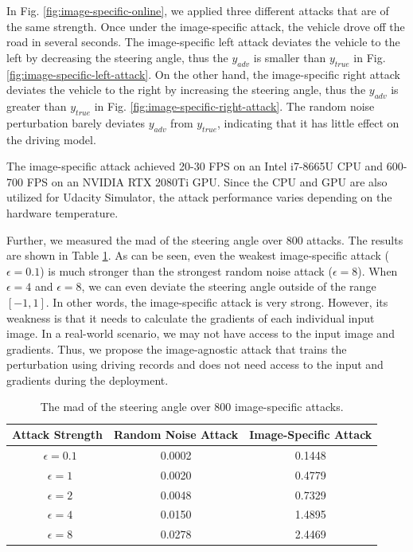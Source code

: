 In Fig. \ref{fig:image-specific-online}, we applied three different attacks that are of the same strength. Once under the image-specific attack, the vehicle drove off the road in several seconds. The image-specific left attack deviates the vehicle to the left by decreasing the steering angle, thus the $y_{adv}$ is smaller than $y_{true}$ in Fig. \ref{fig:image-specific-left-attack}. On the other hand, the image-specific right attack deviates the vehicle to the right by increasing the steering angle, thus the $y_{adv}$ is greater than $y_{true}$ in Fig. \ref{fig:image-specific-right-attack}. The random noise perturbation barely deviates $y_{adv}$ from $y_{true}$, indicating that it has little effect on the driving model.

The image-specific attack achieved 20-30 FPS on an Intel i7-8665U CPU and 600-700 FPS on an NVIDIA RTX 2080Ti GPU. Since the CPU and GPU are also utilized for Udacity Simulator, the attack performance varies depending on the hardware temperature.

Further, we measured the \acrshort{mad} of the steering angle over 800 attacks. The results are shown in Table \ref{tab:image-specific}. As can be seen, even the weakest image-specific attack ($\epsilon=0.1$) is much stronger than the strongest random noise attack ($\epsilon=8$). When $\epsilon = 4$ and $\epsilon = 8$, we can even deviate the steering angle outside of the range $[-1, 1]$. In other words, the image-specific attack is very strong. However, its weakness is that it needs to calculate the gradients of each individual input image. In a real-world scenario, we may not have access to the input image and gradients. Thus, we propose the image-agnostic attack that trains the perturbation using driving records and does not need access to the input and gradients during the deployment.

\begin{table}[H]
    \centering
    \begin{tabular}{ccc}
    \hline
    Attack Strength & Random Noise Attack & Image-Specific Attack\\
    \hline
    \ $\epsilon=0.1$    & 0.0002    & 0.1448 \\
    \ $\epsilon=1$      & 0.0020    & 0.4779 \\
    \ $\epsilon=2$      & 0.0048    & 0.7329 \\
    \ $\epsilon=4$      & 0.0150    & 1.4895 \\
    \ $\epsilon=8$      & 0.0278    & 2.4469 \\
    \hline
    \end{tabular}
    \caption{The \acrfull{mad} of the steering angle over 800 image-specific attacks.}
    \label{tab:image-specific}
\end{table}

